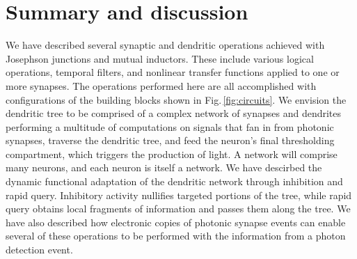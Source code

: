 \documentclass[twocolumn]{article}
\begin{document}
\section{\label{sec:discussion}Summary and discussion}
We have described several synaptic and dendritic operations achieved with Josephson junctions and mutual inductors. These include various logical operations, temporal filters, and nonlinear transfer functions applied to one or more synapses. The operations performed here are all accomplished with configurations of the building blocks shown in Fig.\,\ref{fig:circuits}. We envision the dendritic tree to be comprised of a complex network of synapses and dendrites performing a multitude of computations on signals that fan in from photonic synapses, traverse the dendritic tree, and feed the neuron's final thresholding compartment, which triggers the production of light. A network will comprise many neurons, and each neuron is itself a network. We have descirbed the dynamic functional adaptation of the dendritic network through inhibition and rapid query. Inhibitory activity nullifies targeted portions of the tree, while rapid query obtains local fragments of information and passes them along the tree. We have also described how electronic copies of photonic synapse events can enable several of these operations to be performed with the information from a photon detection event. 
\end{document}
